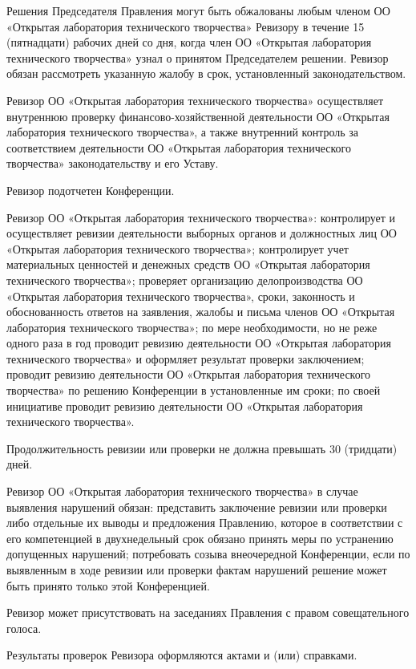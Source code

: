 \documentclass[a4paper,14pt,titlepage]{extarticle}
\begin{document}
Решения Председателя Правления могут быть обжалованы любым членом ОО «Открытая лаборатория технического творчества»
Ревизору в течение 15 (пятнадцати) рабочих дней со дня, когда член ОО «Открытая лаборатория технического творчества»
узнал о принятом Председателем решении. Ревизор обязан рассмотреть указанную жалобу в срок, установленный
законодательством. 

Ревизор ОО «Открытая лаборатория технического творчества» осуществляет внутреннюю проверку финансово-хозяйственной
деятельности ОО «Открытая лаборатория технического творчества», а также внутренний контроль за соответствием
деятельности ОО «Открытая лаборатория технического творчества» законодательству и его Уставу.

Ревизор подотчетен Конференции.

Ревизор ОО «Открытая лаборатория технического творчества»:
контролирует и осуществляет ревизии деятельности выборных органов и должностных лиц ОО «Открытая лаборатория
технического творчества»;
контролирует учет материальных ценностей и денежных средств ОО «Открытая лаборатория технического творчества»;
проверяет организацию делопроизводства ОО «Открытая лаборатория технического творчества», сроки, законность и
обоснованность ответов на заявления, жалобы и письма членов ОО «Открытая лаборатория технического творчества»;
по мере необходимости, но не реже одного раза в год проводит ревизию деятельности ОО «Открытая лаборатория технического
творчества» и оформляет результат проверки заключением;
проводит ревизию деятельности ОО «Открытая лаборатория технического творчества» по решению Конференции в установленные
им сроки;
по своей инициативе проводит ревизию деятельности ОО «Открытая лаборатория технического творчества».

Продолжительность ревизии или проверки не должна превышать 30 (тридцати) дней.

Ревизор ОО «Открытая лаборатория технического творчества» в случае выявления нарушений обязан:
представить заключение ревизии или проверки либо отдельные их выводы и предложения Правлению, которое в соответствии с
его компетенцией в двухнедельный срок обязано принять меры по устранению допущенных нарушений;
потребовать созыва внеочередной Конференции, если по выявленным в ходе ревизии или проверки фактам нарушений решение
может быть принято только этой Конференцией.

Ревизор может присутствовать на заседаниях Правления с правом совещательного голоса.

Результаты проверок Ревизора оформляются актами и (или) справками.
\end{document}
